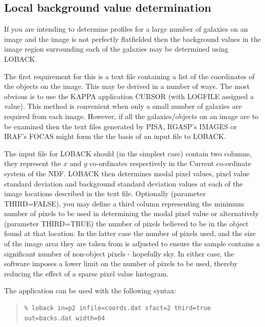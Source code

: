 \documentclass[twoside,11pt]{article}
\newcommand{\xref}[3]{#1}
\newcommand{\xlabel}[1]{}
\newenvironment{myquote}{\begin{quote}\begin{small}}{\end{small}\end{quote}}
\begin{document}
\subsection{Local background value determination}
\xlabel{LOCALBACKGROUNDS}

If you are intending to determine profiles for a large number of 
galaxies on an image and the image is not perfectly flatfielded
then the background values in the image region surrounding
each of the galaxies may be determined using LOBACK.

The first requirement for this is a text file containing a list of the 
coordinates of the objects on the image. This may be derived 
in a number of ways. The most obvious is to use the \xref{KAPPA}{sun95}{} application
CURSOR (with LOGFILE assigned a value). This method is convenient
when only a small number of galaxies are required from each image.
However, if all the galaxies/objects on an image are to be examined then
the text files generated by \xref{PISA}{sun109}{}, RGASP's IMAGES or 
\xref{IRAF}{sun109}{}'s FOCAS might
form the the basis of an input file to LOBACK.

The input file for LOBACK should (in the simplest case) contain two
columns, they represent the $x$ and $y$ co-ordinates respectively 
in the Current co-ordinate system of the NDF.
LOBACK then determines modal pixel values, pixel value standard deviation
and background standard deviation  
values at each of the image locations described in the text file. Optionally
(parameter THIRD=FALSE),
you may define a third column representing the minimum number 
of pixels to be used in determining the modal pixel value or alternatively
(parameter THIRD=TRUE) the number of pixels believed to be in the object found 
at that location. In the latter case the number of pixels used, and the 
size of the image area they are taken from is adjusted to ensure the sample
contains a significant number of non-object pixels - hopefully sky.
In either case, the software imposes a lower limit on the number of pixels 
to be used, thereby reducing the effect of a sparse pixel value histogram.

The application can be used with the following syntax:

\begin{myquote}
\begin{verbatim}
% loback in=p2 infile=coords.dat sfact=2 third=true out=backs.dat width=64
\end{verbatim}
\end{myquote}
\end{document}
